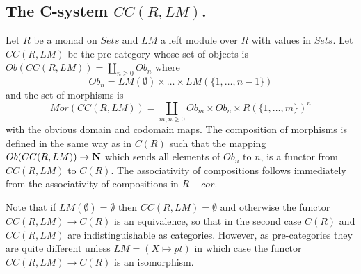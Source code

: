 \documentclass[11pt]{article}
\newcommand{\sr}{\rightarrow}
\newcommand{\nn}{{\bf N\rm}}
\begin{document}
\subsection{The C-system $CC(R,LM)$.}
%
Let $R$ be a monad on $Sets$ and $LM$ a left module over $R$ with values in $Sets$. Let $CC(R,LM)$ be the pre-category whose set of objects is $Ob(CC(R,LM))=\amalg_{n\ge 0} Ob_n$ where 
%
$$Ob_n=LM(\emptyset)\times\dots\times LM(\{1,\dots,n-1\})$$
%
and the set of morphisms is
%
$$Mor(CC(R,LM))=\coprod_{m,n\ge 0} Ob_m\times Ob_n\times R(\{1,\dots,m\})^n$$
%
with the obvious domain and codomain maps. The composition of morphisms is defined in the same way as in $C(R)$ such that the mapping $Ob(CC(R,LM))\sr \nn$ which sends all elements of $Ob_n$ to $n$, is a functor from $CC(R,LM)$ to $C(R)$. The associativity of compositions follows immediately from the associativity of compositions in $R-cor$. 

Note that if $LM(\emptyset)=\emptyset$ then $CC(R,LM)=\emptyset$ and otherwise the functor $CC(R,LM)\sr C(R)$ is an equivalence, so that in the second case $C(R)$ and $CC(R,LM)$ are indistinguishable as categories. However, as pre-categories they are quite different unless $LM=(X\mapsto pt)$ in which case the functor $CC(R,LM)\sr C(R)$ is an isomorphism. 
\end{document}
